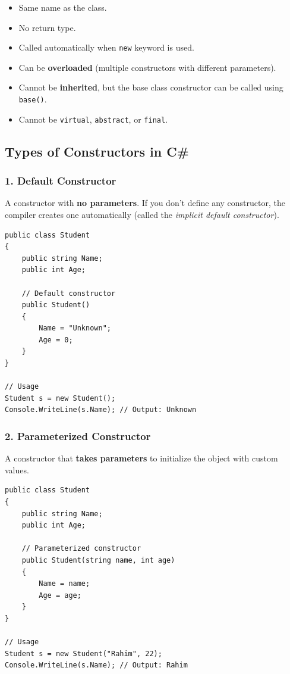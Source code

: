 \documentclass[11pt,a4paper]{article}
\begin{document}
\begin{itemize}[leftmargin=*]
    \item Same name as the class.
    \item No return type.
    \item Called automatically when \texttt{new} keyword is used.
    \item Can be \textbf{overloaded} (multiple constructors with different parameters).
    \item Cannot be \textbf{inherited}, but the base class constructor can be called using \texttt{base()}.
    \item Cannot be \texttt{virtual}, \texttt{abstract}, or \texttt{final}.
\end{itemize}

\subsection{Types of Constructors in C\#}

\subsubsection{1. Default Constructor}

A constructor with \textbf{no parameters}. If you don't define any constructor, the compiler creates one automatically (called the \textit{implicit default constructor}).

\begin{lstlisting}[caption={Default constructor}]
public class Student
{
    public string Name;
    public int Age;

    // Default constructor
    public Student()
    {
        Name = "Unknown";
        Age = 0;
    }
}

// Usage
Student s = new Student();
Console.WriteLine(s.Name); // Output: Unknown
\end{lstlisting}

\subsubsection{2. Parameterized Constructor}

A constructor that \textbf{takes parameters} to initialize the object with custom values.

\begin{lstlisting}[caption={Parameterized constructor}]
public class Student
{
    public string Name;
    public int Age;

    // Parameterized constructor
    public Student(string name, int age)
    {
        Name = name;
        Age = age;
    }
}

// Usage
Student s = new Student("Rahim", 22);
Console.WriteLine(s.Name); // Output: Rahim
\end{lstlisting}
\end{document}
